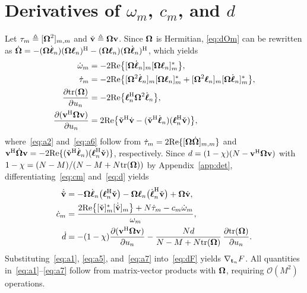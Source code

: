 \documentclass[journal]{IEEEtran}
\begin{document}
\section{Derivatives of $\omega_m$, $c_m$, and $d$}\label{app:grad}
Let $\tau_m\triangleq[\boldsymbol{\Omega}^2]_{m,m}$ and $\check{\mathbf{v}}\triangleq\boldsymbol{\Omega}\mathbf{v}$. Since $\boldsymbol{\Omega}$ is Hermitian, \eqref{eq:dOm} can be rewritten as $\dot{\boldsymbol{\Omega}}=-(\boldsymbol{\Omega}\dot{\boldsymbol{\ell}}_n)(\boldsymbol{\Omega}\boldsymbol{\ell}_n)^{\mathrm H}-(\boldsymbol{\Omega}\boldsymbol{\ell}_n)(\boldsymbol{\Omega}\dot{\boldsymbol{\ell}}_n)^{\mathrm H}$, which yields
\begin{align}
\dot\omega_m&=-2\mathrm{Re}\big\{[\boldsymbol{\Omega}\dot{\boldsymbol{\ell}}_n]_m[\boldsymbol{\Omega}\boldsymbol{\ell}_n]_m^*\big\},\label{eq:a1}\\
\dot\tau_m&=-2\mathrm{Re}\big\{[\boldsymbol{\Omega}^2\dot{\boldsymbol{\ell}}_n]_m[\boldsymbol{\Omega}\boldsymbol{\ell}_n]_m^*+[\boldsymbol{\Omega}^2\boldsymbol{\ell}_n]_m[\boldsymbol{\Omega}\dot{\boldsymbol{\ell}}_n]_m^*\big\},\label{eq:a2}\\
\frac{\partial\mathrm{tr}(\boldsymbol{\Omega})}{\partial u_n}&=-2\mathrm{Re}\big\{\boldsymbol{\ell}_n^{\mathrm H}\boldsymbol{\Omega}^2\dot{\boldsymbol{\ell}}_n\big\},\label{eq:a3}\\
\frac{\partial(\mathbf{v}^{\mathrm H}\boldsymbol{\Omega}\mathbf{v})}{\partial u_n}&=2\mathrm{Re}\big\{\check{\mathbf{v}}^{\mathrm H}\dot{\mathbf{v}}-(\check{\mathbf{v}}^{\mathrm H}\dot{\boldsymbol{\ell}}_n)(\boldsymbol{\ell}_n^{\mathrm H}\check{\mathbf{v}})\big\},\label{eq:a6}
\end{align}
where~\eqref{eq:a2} and~\eqref{eq:a6} follow from $\dot\tau_m=2\mathrm{Re}\{[\boldsymbol{\Omega}\dot{\boldsymbol{\Omega}}]_{m,m}\}$ and $\mathbf{v}^{\mathrm H}\dot{\boldsymbol{\Omega}}\mathbf{v}=-2\mathrm{Re}\{(\check{\mathbf{v}}^{\mathrm H}\dot{\boldsymbol{\ell}}_n)(\boldsymbol{\ell}_n^{\mathrm H}\check{\mathbf{v}})\}$, respectively. Since $d=(1-\chi)(N-\mathbf{v}^{\mathrm H}\boldsymbol{\Omega}\mathbf{v})$ with $1-\chi=(N-M)/(N-M+N\mathrm{tr}(\boldsymbol{\Omega}))$ by Appendix~\ref{app:det}, differentiating~\eqref{eq:cm} and~\eqref{eq:d} yields
\begin{align}
\dot{\check{\mathbf{v}}}&=-\boldsymbol{\Omega}\dot{\boldsymbol{\ell}}_n\big(\boldsymbol{\ell}_n^{\mathrm H}\check{\mathbf{v}}\big)-\boldsymbol{\Omega}\boldsymbol{\ell}_n\big(\dot{\boldsymbol{\ell}}_n^{\mathrm H}\check{\mathbf{v}}\big)+\boldsymbol{\Omega}\dot{\mathbf{v}},\label{eq:a4}\\
\dot c_m&=\frac{2\mathrm{Re}\big\{[\check{\mathbf{v}}]_m^*[\dot{\check{\mathbf{v}}}]_m\big\}+N\dot\tau_m-c_m\dot\omega_m}{\omega_m},\label{eq:a5}\\
\dot d&=-(1-\chi)\frac{\partial(\mathbf{v}^{\mathrm H}\boldsymbol{\Omega}\mathbf{v})}{\partial u_n}-\frac{Nd}{N-M+N\mathrm{tr}(\boldsymbol{\Omega})}\,\frac{\partial\mathrm{tr}(\boldsymbol{\Omega})}{\partial u_n}.\label{eq:a7}
\end{align}
Substituting~\eqref{eq:a1}, \eqref{eq:a5}, and~\eqref{eq:a7} into~\eqref{eq:dF} yields $\nabla_{\mathbf{t}_n}F$. All quantities in~\eqref{eq:a1}--\eqref{eq:a7} follow from matrix-vector products with $\boldsymbol{\Omega}$, requiring $\mathcal O(M^2)$ operations.
\end{document}
